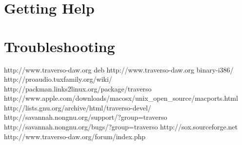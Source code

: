 \documentclass[a4paper,
               12pt,
               pdftex,
               twoside,
               smallheadings,
               headinclude,
               headsepline,
               DIV16,
               BCOR10mm,
               halfparskip
               ]{scrreprt}
\begin{document}
\chapter{Getting Help\label{sect_help}}

\chapter{Troubleshooting}


\begin{thebibliography}{xx}
   http://www.traverso-daw.org
   deb http://www.traverso-daw.org binary-i386/
   http://proaudio.tuxfamily.org/wiki/
   http://packman.links2linux.org/package/traverso
   http://www.apple.com/downloads/macosx/unix\_open\_source/macports.html
   http://lists.gnu.org/archive/html/traverso-devel/
   http://savannah.nongnu.org/support/?group=traverso
   http://savannah.nongnu.org/bugs/?group=traverso
   http://sox.sourceforge.net
   http://www.traverso-daw.org/forum/index.php
\end{thebibliography}
\end{document}
